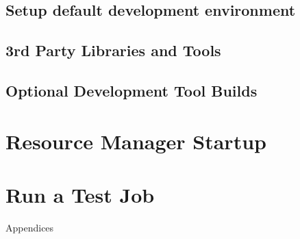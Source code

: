\documentclass[letterpaper]{article}
\begin{document}
\subsection{Setup default development environment}


\subsection{3rd Party Libraries and Tools} \label{sec:3rdparty}


\vspace*{.4cm}



\subsection{Optional Development Tool Builds} \label{sec:3rdparty_arm}


\clearpage
\section{Resource Manager Startup} \label{sec:rms_startup}


\section{Run a Test Job} \label{sec:test_job}


\clearpage
\appendix
{\bf \LARGE \centerline{Appendices}} \vspace*{0.2cm}

\renewcommand{\thesubsection}{\Alph{subsection}}







\end{document}
